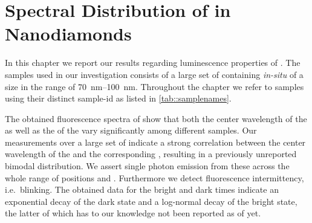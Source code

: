 
\chapter[Spectral Distribution]{Spectral Distribution of \sivs in Nanodiamonds}	\label{ch::distribution}

	In this chapter we report our results regarding luminescence properties of \sivs. The samples used in our investigation consists of a large set of \CVD \nds containing \textit{in-situ} \sivs of a size in the range of \SIrange{70}{100}{\nm}. Throughout the chapter we refer to samples using their distinct sample-id as listed in \autoref{tab::samplenames}.

	The obtained fluorescence spectra of \sivs show that both the center wavelength of the \ZPL as well as the \lw of the \zpl vary significantly among different samples.
	Our measurements over a large set of \sivs indicate a strong correlation between the center wavelength of the \zpl and the corresponding \lws, resulting in a previously unreported bimodal distribution.
	We assert single photon emission from these \sivs across the whole range of \zpl positions and \lws.
	Furthermore we detect fluorescence intermittency, i.e.\ blinking. The obtained data for the bright and dark times indicate
	an exponential decay of the dark state and a log-normal decay of the bright state, the latter of which has to our knowledge not been reported as of yet.
